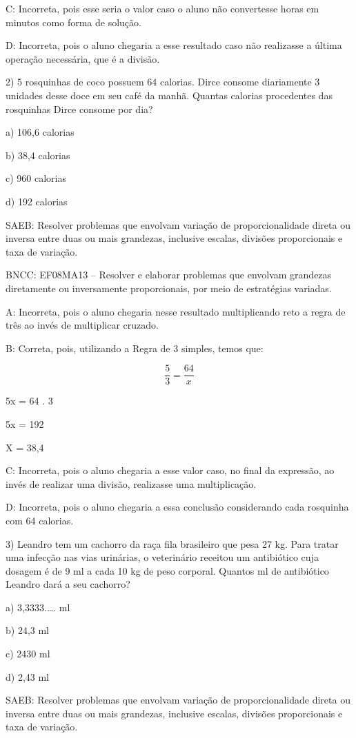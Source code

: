 C: Incorreta, pois esse seria o valor caso o aluno não convertesse horas
em minutos como forma de solução.

D: Incorreta, pois o aluno chegaria a esse resultado caso não realizasse
a última operação necessária, que é a divisão.

2) 5 rosquinhas de coco possuem 64 calorias. Dirce consome diariamente 3
unidades desse doce em seu café da manhã. Quantas calorias procedentes
das rosquinhas Dirce consome por dia?

a) 106,6 calorias

b) 38,4 calorias

c) 960 calorias

d) 192 calorias

SAEB: Resolver problemas que envolvam variação de proporcionalidade
direta ou inversa entre duas ou mais grandezas, inclusive escalas,
divisões proporcionais e taxa de variação.

BNCC: EF08MA13 -- Resolver e elaborar problemas que envolvam grandezas
diretamente ou inversamente proporcionais, por meio de estratégias
variadas.

A: Incorreta, pois o aluno chegaria nesse resultado multiplicando reto a
regra de três ao invés de multiplicar cruzado.

B: Correta, pois, utilizando a Regra de 3 simples, temos que:

\[\frac {5}{3} = \frac{64}{x}\]

5x = 64 . 3

5x = 192

X = 38,4

C: Incorreta, pois o aluno chegaria a esse valor caso, no final da
expressão, ao invés de realizar uma divisão, realizasse uma
multiplicação.

D: Incorreta, pois o aluno chegaria a essa conclusão considerando cada
rosquinha com 64 calorias.

3) Leandro tem um cachorro da raça fila brasileiro que pesa 27 kg. Para
tratar uma infecção nas vias urinárias, o veterinário receitou um
antibiótico cuja dosagem é de 9 ml a cada 10 kg de peso corporal.
Quantos ml de antibiótico Leandro dará a seu cachorro?

a) 3,3333.\ldots. ml

b) 24,3 ml

c) 2430 ml

d) 2,43 ml

SAEB: Resolver problemas que envolvam variação de proporcionalidade
direta ou inversa entre duas ou mais grandezas, inclusive escalas,
divisões proporcionais e taxa de variação.

